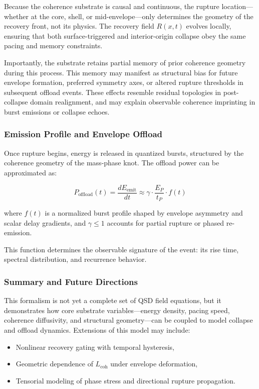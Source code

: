 \documentclass[entropy,article,submit,pdftex,moreauthors]{Definitions/mdpi}
\begin{document}
Because the coherence substrate is causal and continuous, the rupture location—whether at the core, shell, or mid-envelope—only determines the geometry of the recovery front, not its physics. The recovery field $R(x,t)$ evolves locally, ensuring that both surface-triggered and interior-origin collapse obey the same pacing and memory constraints.

Importantly, the substrate retains partial memory of prior coherence geometry during this process. This memory may manifest as structural bias for future envelope formation, preferred symmetry axes, or altered rupture thresholds in subsequent offload events. These effects resemble residual topologies in post-collapse domain realignment, and may explain observable coherence imprinting in burst emissions or collapse echoes.



\subsubsection{Emission Profile and Envelope Offload}

Once rupture begins, energy is released in quantized bursts, structured by the coherence geometry of the mass-phase knot. The offload power can be approximated as:

\begin{equation}
P_{\text{offload}}(t) = \frac{dE_{\text{emit}}}{dt} \approx \gamma \cdot \frac{E_P}{t_P} \cdot f(t)
\end{equation}

where $f(t)$ is a normalized burst profile shaped by envelope asymmetry and scalar delay gradients, and $\gamma \leq 1$ accounts for partial rupture or phased re-emission.

This function determines the observable signature of the event: its rise time, spectral distribution, and recurrence behavior.

\subsubsection{Summary and Future Directions}

This formalism is not yet a complete set of QSD field equations, but it demonstrates how core substrate variables---energy density, pacing speed, coherence diffusivity, and structural geometry---can be coupled to model collapse and offload dynamics. Extensions of this model may include:

\begin{itemize}
  \item Nonlinear recovery gating with temporal hysteresis,
  \item Geometric dependence of $L_{\text{coh}}$ under envelope deformation,
  \item Tensorial modeling of phase stress and directional rupture propagation.
\end{itemize}
\end{document}
